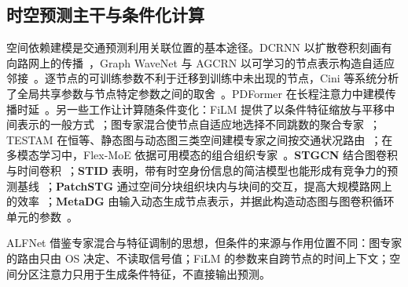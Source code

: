 \subsection{时空预测主干与条件化计算}\label{sec:2_4}

空间依赖建模是交通预测利用关联位置的基本途径。DCRNN 以扩散卷积刻画有向路网上的传播~\citep{li2018diffusion}，Graph WaveNet 与 AGCRN 以可学习的节点表示构造自适应邻接~\citep{wu2019graph,bai2020adaptive}。逐节点的可训练参数不利于迁移到训练中未出现的节点，Cini 等系统分析了全局共享参数与节点特定参数之间的取舍~\citep{cini2023taming}。PDFormer 在长程注意力中建模传播时延~\citep{jiang2023pdformer}。另一些工作让计算随条件变化：FiLM 提供了以条件特征缩放与平移中间表示的一般方式~\citep{perez2018film}；图专家混合使节点自适应地选择不同跳数的聚合专家~\citep{wang2023graph}；TESTAM 在恒等、静态图与动态图三类空间建模专家之间按交通状况路由~\citep{lee2024testam}；在多模态学习中，Flex-MoE 依据可用模态的组合组织专家~\citep{yun2024flexmoe}。\textbf{STGCN} 结合图卷积与时间卷积~\citep{yu2018spatio}；\textbf{STID} 表明，带有时空身份信息的简洁模型也能形成有竞争力的预测基线~\citep{shao2022spatial}；\textbf{PatchSTG} 通过空间分块组织块内与块间的交互，提高大规模路网上的效率~\citep{fang2025efficient}；\textbf{MetaDG} 由输入动态生成节点表示，并据此构造动态图与图卷积循环单元的参数~\citep{zou2026meta}。

ALFNet 借鉴专家混合与特征调制的思想，但条件的来源与作用位置不同：图专家的路由只由 OS 决定、不读取信号值；FiLM 的参数来自跨节点的时间上下文；空间分区注意力只用于生成条件特征，不直接输出预测。
